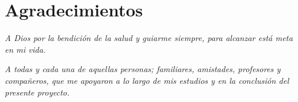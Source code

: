 \thispagestyle{plain}
\chapter*{Agradecimientos}
\begin{flushright}
\textit{A Dios por la bendición de la salud y  guiarme siempre, para alcanzar está meta en mi vida.}
\end{flushright}
\vspace{1cm}
\begin{flushright}
\textit{A todas y cada una de aquellas personas; familiares, amistades, profesores y compañeros, que me apoyaron a lo largo de mis estudios y en la conclusión del presente proyecto.} 
\end{flushright}